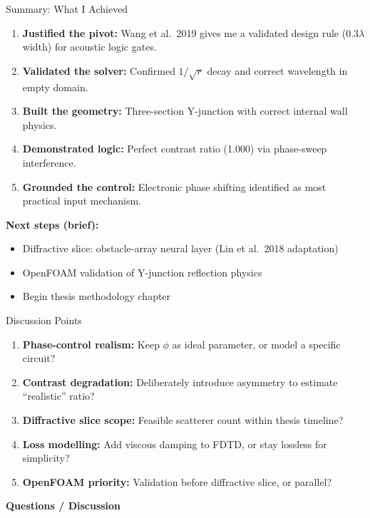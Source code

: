 \documentclass[aspectratio=169,11pt]{beamer}
\begin{document}
\begin{frame}{Summary: What I Achieved}
  \begin{enumerate}
    \item \textbf{Justified the pivot:} Wang et al.\ 2019 gives me a validated design rule ($0.3\lambda$ width) for acoustic logic gates.
    \item \textbf{Validated the solver:} Confirmed $1/\sqrt{r}$ decay and correct wavelength in empty domain.
    \item \textbf{Built the geometry:} Three-section Y-junction with correct internal wall physics.
    \item \textbf{Demonstrated logic:} Perfect contrast ratio (1.000) via phase-sweep interference.
    \item \textbf{Grounded the control:} Electronic phase shifting identified as most practical input mechanism.
  \end{enumerate}

  \vspace{0.2cm}
  \textbf{Next steps (brief):}
  \begin{itemize}
    \item Diffractive slice: obstacle-array neural layer (Lin et al.\ 2018 adaptation)
    \item OpenFOAM validation of Y-junction reflection physics
    \item Begin thesis methodology chapter
  \end{itemize}
\end{frame}

\begin{frame}{Discussion Points}
  \begin{enumerate}
    \item \textbf{Phase-control realism:} Keep $\phi$ as ideal parameter, or model a specific circuit?
    \item \textbf{Contrast degradation:} Deliberately introduce asymmetry to estimate ``realistic'' ratio?
    \item \textbf{Diffractive slice scope:} Feasible scatterer count within thesis timeline?
    \item \textbf{Loss modelling:} Add viscous damping to FDTD, or stay lossless for simplicity?
    \item \textbf{OpenFOAM priority:} Validation before diffractive slice, or parallel?
  \end{enumerate}

  \vspace{0.4cm}
  \begin{center}
    \Large\textbf{\textcolor{gdpPurple}{Questions / Discussion}}
  \end{center}
\end{frame}
\end{document}
